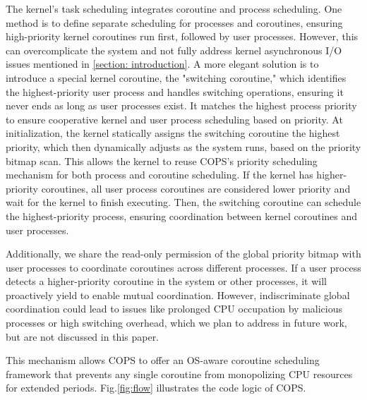 \documentclass[conference]{IEEEtran}
\begin{document}
The kernel's task scheduling integrates coroutine and process scheduling. One method is to define separate scheduling for processes and coroutines, ensuring high-priority kernel coroutines run first, followed by user processes. However, this can overcomplicate the system and not fully address kernel asynchronous I/O issues mentioned in \ref{section: introduction}. A more elegant solution is to introduce a special kernel coroutine, the "switching coroutine," which identifies the highest-priority user process and handles switching operations, ensuring it never ends as long as user processes exist. It matches the highest process priority to ensure cooperative kernel and user process scheduling based on priority. At initialization, the kernel statically assigns the switching coroutine the highest priority, which then dynamically adjusts as the system runs, based on the priority bitmap scan. This allows the kernel to reuse COPS's priority scheduling mechanism for both process and coroutine scheduling. If the kernel has higher-priority coroutines, all user process coroutines are considered lower priority and wait for the kernel to finish executing. Then, the switching coroutine can schedule the highest-priority process, ensuring coordination between kernel coroutines and user processes.

Additionally, we share the read-only permission of the global priority bitmap with user processes to coordinate coroutines across different processes. If a user process detects a higher-priority coroutine in the system or other processes, it will proactively yield to enable mutual coordination. However, indiscriminate global coordination could lead to issues like prolonged CPU occupation by malicious processes or high switching overhead, which we plan to address in future work, but are not discussed in this paper.

This mechanism allows COPS to offer an OS-aware coroutine scheduling framework that prevents any single coroutine from monopolizing CPU resources for extended periods. Fig.\ref{fig:flow} illustrates the code logic of COPS.
\end{document}
